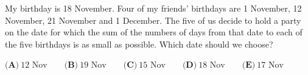 My birthday is 18 November. Four of my friends' birthdays are 1 November, 12 November, 21 November and 1 December. The five of us decide to hold a party on the date for which the sum of the numbers of days from that date to each of the five birthdays is as small as possible. Which date should we choose?

$\textbf{(A)}\ \text{12 Nov}\qquad\textbf{(B)}\ \text{19 Nov}\qquad\textbf{(C)}\ \text{15 Nov}\qquad\textbf{(D)}\ \text{18 Nov}\qquad\textbf{(E)}\ \text{17 Nov}$
